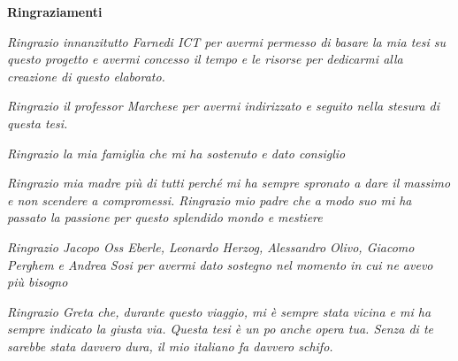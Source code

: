 \thispagestyle{empty}

\begin{center}
  {\bf \Huge Ringraziamenti}
\end{center}

\vspace{4cm}


\emph{
  Ringrazio innanzitutto Farnedi ICT per avermi permesso di basare la mia tesi su questo progetto e avermi concesso il tempo e le risorse per dedicarmi alla creazione di questo elaborato.}	\vspace{5mm}
  
  \emph{
  Ringrazio il professor Marchese per avermi indirizzato e seguito nella stesura di questa tesi.}	\vspace{5mm}
  
  \emph{
 Ringrazio la mia famiglia che mi ha sostenuto e dato consiglio}	\vspace{5mm}
 
  \emph{
 Ringrazio mia madre più di tutti perché mi ha sempre spronato a dare il massimo e non scendere a compromessi. Ringrazio mio padre che a modo suo mi ha passato la passione per questo splendido mondo e mestiere}	\vspace{5mm}
 
 \emph{
 Ringrazio Jacopo Oss Eberle, Leonardo Herzog, Alessandro Olivo, Giacomo Perghem e Andrea Sosi per avermi dato sostegno nel momento in cui ne avevo più bisogno}	\vspace{5mm}
 
 \emph{
  Ringrazio Greta che, durante questo viaggio, mi è sempre stata vicina e mi ha sempre indicato la giusta via. Questa tesi è un po anche opera tua. Senza di te sarebbe stata davvero dura, il mio italiano fa davvero schifo.}	\vspace{5mm}
